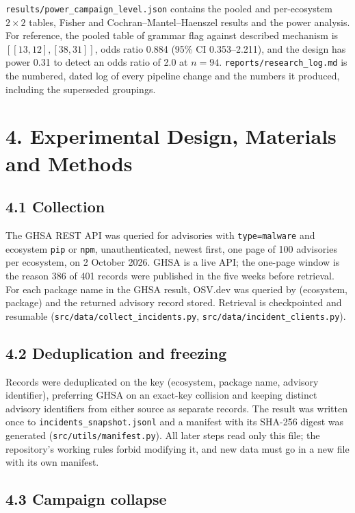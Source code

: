 \documentclass[preprint,12pt]{elsarticle}
\begin{document}
\texttt{results/power\_campaign\_level.json} contains the pooled and per-ecosystem $2\times2$ tables, Fisher and Cochran--Mantel--Haenszel results and the power analysis. For reference, the pooled table of grammar flag against described mechanism is $[[13,12],[38,31]]$, odds ratio 0.884 (95\% CI 0.353--2.211), and the design has power 0.31 to detect an odds ratio of 2.0 at $n=94$. \texttt{reports/research\_log.md} is the numbered, dated log of every pipeline change and the numbers it produced, including the superseded groupings.

\section*{4. Experimental Design, Materials and Methods}

\subsection*{4.1 Collection}

The GHSA REST API was queried for advisories with \texttt{type=malware} and ecosystem \texttt{pip} or \texttt{npm}, unauthenticated, newest first, one page of 100 advisories per ecosystem, on 2 October 2026. GHSA is a live API; the one-page window is the reason 386 of 401 records were published in the five weeks before retrieval. For each package name in the GHSA result, OSV.dev was queried by (ecosystem, package) and the returned advisory record stored. Retrieval is checkpointed and resumable (\texttt{src/data/collect\_incidents.py}, \texttt{src/data/incident\_clients.py}).

\subsection*{4.2 Deduplication and freezing}

Records were deduplicated on the key (ecosystem, package name, advisory identifier), preferring GHSA on an exact-key collision and keeping distinct advisory identifiers from either source as separate records. The result was written once to \texttt{incidents\_snapshot.jsonl} and a manifest with its SHA-256 digest was generated (\texttt{src/utils/manifest.py}). All later steps read only this file; the repository's working rules forbid modifying it, and new data must go in a new file with its own manifest.

\subsection*{4.3 Campaign collapse}
\end{document}
